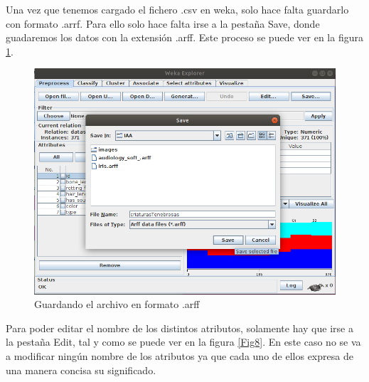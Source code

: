 \documentclass[11pt,twoside,a4paper]{book}
\begin{document}
Una vez que tenemos cargado el fichero .csv en weka, solo hace falta guardarlo con
formato .arrf. Para ello solo hace falta irse a la pestaña Save, donde guadaremos
los datos con la extensión .arff. Este proceso se puede ver en la figura \ref{Fig7}.

\begin{figure}[H]
   \begin{center}
      \includegraphics[width=\textwidth]{ejercicio4_2.png}
   \end{center}
	\caption{Guardando el archivo en formato .arff}
	\label{Fig7}
\end{figure}

Para poder editar el nombre de los distintos atributos, solamente hay que irse a la
pestaña Edit, tal y como se puede ver en la figura \ref{Fig8}.
En este caso no se va a modificar ningún nombre de los atributos ya que cada uno
de ellos expresa de una manera concisa su significado.
\end{document}
